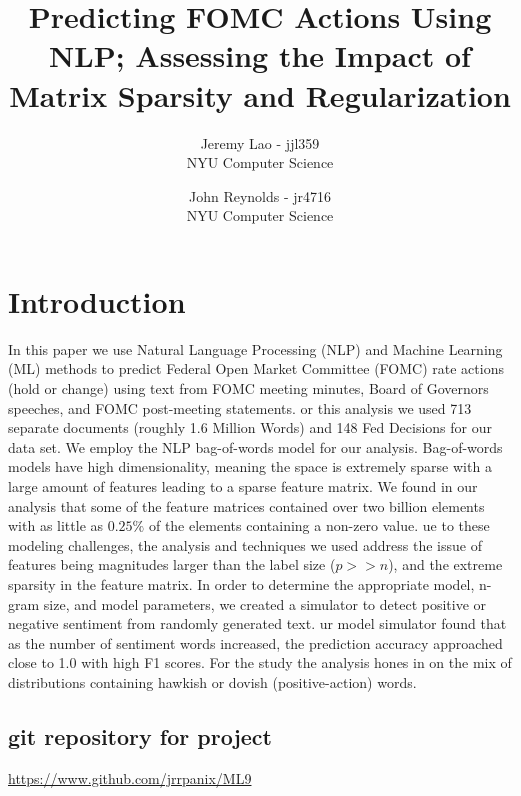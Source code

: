 \documentclass[11pt]{article}
\title{Predicting FOMC Actions Using NLP; Assessing the Impact of Matrix Sparsity and Regularization}
\author{
        Jeremy Lao - jjl359 \\
        NYU Computer Science \\
            \and
        John Reynolds - jr4716 \\
        NYU Computer Science \\
}
\newcommand{\vertSpace}[1]{\vspace{3mm}}
\begin{document}
{\setlength{\mathindent}{0cm}
\maketitle


\section{Introduction}
In this paper we use Natural Language Processing (NLP) and Machine Learning (ML) methods to predict Federal Open Market Committee (FOMC) rate actions (hold or change) using text from FOMC meeting minutes, Board of Governors speeches, and FOMC post-meeting statements.  \vertSpace

 
For this analysis we used 713 separate documents (roughly 1.6 Million Words) and 148 Fed Decisions for our data set.  We employ the NLP bag-of-words model for our analysis.  Bag-of-words models have high dimensionality, meaning the space is extremely sparse with a large amount of features leading to a sparse feature matrix.  We found in our analysis that some of the feature matrices contained over two billion elements with as little as $0.25\%$ of the elements containing a non-zero value.  \vertSpace


Due to these modeling challenges, the analysis and techniques we used address the issue of features being magnitudes larger than the label size ($p>>n$), and the extreme sparsity in the feature matrix.  In order to determine the appropriate model, n-gram size, and model parameters, we created a simulator to detect positive or negative sentiment from randomly generated text.  \vertSpace 


Our model simulator found that as the number of sentiment words increased, the prediction accuracy approached close to 1.0 with high F1 scores.  For the study the analysis hones in on the mix of distributions containing hawkish or dovish (positive-action) words.


\subsection{git repository for project}
\url{https://www.github.com/jrrpanix/ML9}

}
\end{document}
